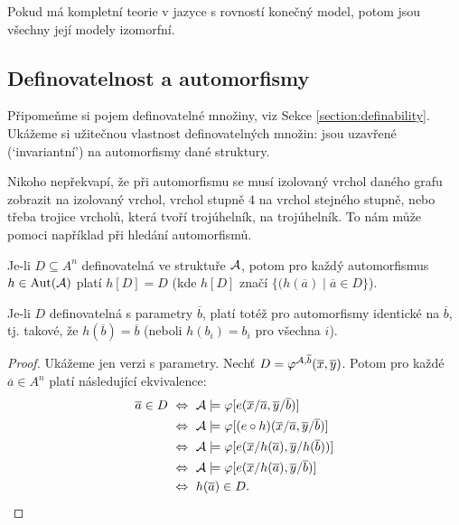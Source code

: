 \begin{corollary}
    Pokud má kompletní teorie v jazyce s rovností konečný model, potom jsou všechny její modely izomorfní.
\end{corollary}


\subsection{Definovatelnost a automorfismy}

Připomeňme si pojem definovatelné množiny, viz Sekce \ref{section:definability}. Ukážeme si užitečnou vlastnost definovatelných množin: jsou uzavřené (`invariantní') na automorfismy dané struktury. 

Nikoho nepřekvapí, že při automorfismu se musí izolovaný vrchol daného grafu zobrazit na izolovaný vrchol, vrchol stupně 4 na vrchol stejného stupně, nebo třeba trojice vrcholů, která tvoří trojúhelník, na trojúhelník. To nám může pomoci například při hledání automorfismů.

\begin{proposition}
    Je-li $D\subseteq A^n$ definovatelná ve struktuře $\mathcal{A}$, potom pro každý automorfismus $h\in\operatorname{Aut}(\mathcal{A})$ platí $h[D]=D$ (kde $h[D]$ značí $\{(h(\overline{a})\mid\overline{a}\in D\}$).

    Je-li $D$ definovatelná s parametry $\overline{b}$, platí totéž pro automorfismy identické na $\overline{b}$, tj. takové, že $h(\overline{b})=\overline{b}$ (neboli $h(b_i)=b_i$ pro všechna $i$).
\end{proposition}
\begin{proof}
    Ukážeme jen verzi s parametry. Nechť $D=\varphi^{\mathcal{A},\overline{b}}(\overline{x},\overline{y})$. Potom pro každé $\overline{a}\in A^n$ platí následující ekvivalence:
\begin{align*}
\overline{a}\in D\ 
&\Leftrightarrow\ \A\models \varphi[e(\overline{x}/\overline{a},\overline{y}/\overline{b})]\\
&\Leftrightarrow\  \A\models \varphi[(e\circ h)(\overline{x}/\overline{a},\overline{y}/\overline{b})]\\
&\Leftrightarrow\ \A\models \varphi[e(\overline{x}/h(\overline{a}),\overline{y}/h(\overline{b}))]\\
&\Leftrightarrow\ \A\models \varphi[e(\overline{x}/h(\overline{a}),\overline{y}/\overline{b})]\\
&\Leftrightarrow\ h(\overline{a})\in D.
\end{align*}
\end{proof}

